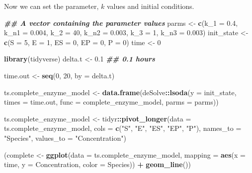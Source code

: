 \documentclass[
]{article}
\newenvironment{Shaded}{\begin{snugshade}}{\end{snugshade}}
\newcommand{\AttributeTok}[1]{\textcolor[rgb]{0.13,0.29,0.53}{#1}}
\newcommand{\DecValTok}[1]{\textcolor[rgb]{0.00,0.00,0.81}{#1}}
\newcommand{\DocumentationTok}[1]{\textcolor[rgb]{0.56,0.35,0.01}{\textbf{\textit{#1}}}}
\newcommand{\FloatTok}[1]{\textcolor[rgb]{0.00,0.00,0.81}{#1}}
\newcommand{\FunctionTok}[1]{\textcolor[rgb]{0.13,0.29,0.53}{\textbf{#1}}}
\newcommand{\NormalTok}[1]{#1}
\newcommand{\OtherTok}[1]{\textcolor[rgb]{0.56,0.35,0.01}{#1}}
\newcommand{\SpecialCharTok}[1]{\textcolor[rgb]{0.81,0.36,0.00}{\textbf{#1}}}
\newcommand{\StringTok}[1]{\textcolor[rgb]{0.31,0.60,0.02}{#1}}
\begin{document}
Now we can set the parameter, \(k\) values and initial conditions.

\begin{Shaded}
\begin{Highlighting}[]
\DocumentationTok{\#\# A vector containing the parameter values}
\NormalTok{parms }\OtherTok{\textless{}{-}} \FunctionTok{c}\NormalTok{(}\AttributeTok{k\_1 =} \FloatTok{0.4}\NormalTok{, }\AttributeTok{k\_n1 =} \FloatTok{0.004}\NormalTok{, }\AttributeTok{k\_2 =} \DecValTok{40}\NormalTok{, }\AttributeTok{k\_n2 =} \FloatTok{0.003}\NormalTok{,}
    \AttributeTok{k\_3 =} \DecValTok{1}\NormalTok{, }\AttributeTok{k\_n3 =} \FloatTok{0.003}\NormalTok{)}
\NormalTok{init\_state }\OtherTok{\textless{}{-}} \FunctionTok{c}\NormalTok{(}\AttributeTok{S =} \DecValTok{5}\NormalTok{, }\AttributeTok{E =} \DecValTok{1}\NormalTok{, }\AttributeTok{ES =} \DecValTok{0}\NormalTok{, }\AttributeTok{EP =} \DecValTok{0}\NormalTok{, }\AttributeTok{P =} \DecValTok{0}\NormalTok{)}
\NormalTok{time }\OtherTok{\textless{}{-}} \DecValTok{0}

\FunctionTok{library}\NormalTok{(tidyverse)}
\NormalTok{delta.t }\OtherTok{\textless{}{-}} \FloatTok{0.1}  \DocumentationTok{\#\# 0.1 hours}

\NormalTok{time.out }\OtherTok{\textless{}{-}} \FunctionTok{seq}\NormalTok{(}\DecValTok{0}\NormalTok{, }\DecValTok{20}\NormalTok{, }\AttributeTok{by =}\NormalTok{ delta.t)}

\NormalTok{ts.complete\_enzyme\_model }\OtherTok{\textless{}{-}} \FunctionTok{data.frame}\NormalTok{(deSolve}\SpecialCharTok{::}\FunctionTok{lsoda}\NormalTok{(}\AttributeTok{y =}\NormalTok{ init\_state,}
    \AttributeTok{times =}\NormalTok{ time.out, }\AttributeTok{func =}\NormalTok{ complete\_enzyme\_model,}
    \AttributeTok{parms =}\NormalTok{ parms))}

\NormalTok{ts.complete\_enzyme\_model }\OtherTok{\textless{}{-}}\NormalTok{ tidyr}\SpecialCharTok{::}\FunctionTok{pivot\_longer}\NormalTok{(}\AttributeTok{data =}\NormalTok{ ts.complete\_enzyme\_model,}
    \AttributeTok{cols =} \FunctionTok{c}\NormalTok{(}\StringTok{"S"}\NormalTok{, }\StringTok{"E"}\NormalTok{, }\StringTok{"ES"}\NormalTok{, }\StringTok{"EP"}\NormalTok{, }\StringTok{"P"}\NormalTok{), }\AttributeTok{names\_to =} \StringTok{"Species"}\NormalTok{,}
    \AttributeTok{values\_to =} \StringTok{"Concentration"}\NormalTok{)}

\NormalTok{(complete }\OtherTok{\textless{}{-}} \FunctionTok{ggplot}\NormalTok{(}\AttributeTok{data =}\NormalTok{ ts.complete\_enzyme\_model,}
    \AttributeTok{mapping =} \FunctionTok{aes}\NormalTok{(}\AttributeTok{x =}\NormalTok{ time, }\AttributeTok{y =}\NormalTok{ Concentration, }\AttributeTok{color =}\NormalTok{ Species)) }\SpecialCharTok{+}
    \FunctionTok{geom\_line}\NormalTok{())}
\end{Highlighting}
\end{Shaded}
\end{document}
